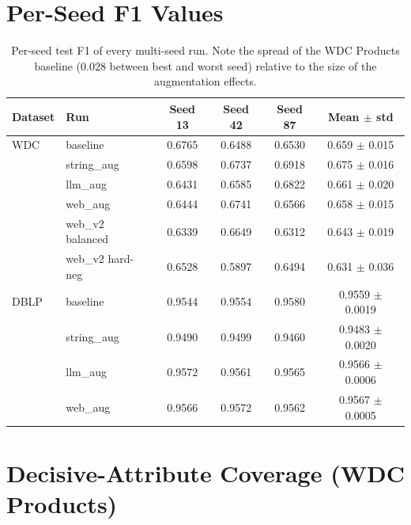 \documentclass[a4paper,oneside,bibliography=totoc]{scrbook}
\begin{document}
\section{Per-Seed F1 Values}
\label{app:perseed}

\begin{table}[!htbp]
  \centering
  \begin{tabular}{llcccc}
    \toprule
    \textbf{Dataset} & \textbf{Run} & \textbf{Seed 13} & \textbf{Seed 42} & \textbf{Seed 87} & \textbf{Mean $\pm$ std} \\
    \midrule
    WDC & baseline & 0.6765 & 0.6488 & 0.6530 & 0.659 $\pm$ 0.015 \\
        & string\_aug & 0.6598 & 0.6737 & 0.6918 & 0.675 $\pm$ 0.016 \\
        & llm\_aug & 0.6431 & 0.6585 & 0.6822 & 0.661 $\pm$ 0.020 \\
        & web\_aug & 0.6444 & 0.6741 & 0.6566 & 0.658 $\pm$ 0.015 \\
        & web\_v2 balanced & 0.6339 & 0.6649 & 0.6312 & 0.643 $\pm$ 0.019 \\
        & web\_v2 hard-neg & 0.6528 & 0.5897 & 0.6494 & 0.631 $\pm$ 0.036 \\
    \midrule
    DBLP & baseline & 0.9544 & 0.9554 & 0.9580 & 0.9559 $\pm$ 0.0019 \\
         & string\_aug & 0.9490 & 0.9499 & 0.9460 & 0.9483 $\pm$ 0.0020 \\
         & llm\_aug & 0.9572 & 0.9561 & 0.9565 & 0.9566 $\pm$ 0.0006 \\
         & web\_aug & 0.9566 & 0.9572 & 0.9562 & 0.9567 $\pm$ 0.0005 \\
    \bottomrule
  \end{tabular}
  \caption{Per-seed test F1 of every multi-seed run. Note the spread of the WDC Products baseline (0.028 between best and worst seed) relative to the size of the augmentation effects.}
  \label{tab:perseed}
\end{table}

\section{Decisive-Attribute Coverage (WDC Products)}
\label{app:coverage}
\end{document}
